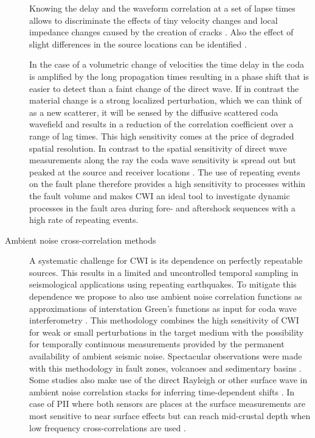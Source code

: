 \documentclass[11pt]{article}
\begin{document}
\begin{description}
Knowing the delay and the waveform correlation at a set of lapse times allows to discriminate the effects of tiny velocity changes and local impedance changes caused by the creation of cracks \citep{Larose2010}. Also the effect of slight differences in the source locations can be identified \citep{Snieder2005,Kummerow2010}.

In the case of a volumetric change of velocities the time delay in the coda is amplified by the long propagation times resulting in a phase shift that is easier to detect than a faint change of the direct wave. If in contrast the material change is a strong localized perturbation, which we can think of as a new scatterer, it will be sensed by the diffusive scattered coda wavefield and results in a reduction of the correlation coefficient over a range of lag times.
This high sensitivity comes at the price of degraded spatial resolution. In contrast to the spatial sensitivity of direct wave measurements along the ray the coda wave sensitivity is spread out but peaked at the source and receiver locations \citep{pacheco_snieder_JASA_05,planes_etal_WCRM_14,obermann13}. The use of repeating events on the fault plane therefore provides a high sensitivity to processes within the fault volume and makes CWI an ideal tool  to investigate dynamic processes in the fault area during fore- and aftershock sequences with a high rate of repeating events.


\item[Ambient noise cross-correlation methods]
A systematic challenge for CWI is its dependence on perfectly repeatable sources. This results in a limited and uncontrolled temporal sampling in seismological applications using repeating earthquakes. To mitigate this dependence we propose to also use ambient noise correlation functions as approximations of interstation Green's functions as input for coda wave interferometry \citep{sens-schoenfelder_wegler_GRL_06}. This methodology combines the high sensitivity of CWI for weak or small perturbations in the target medium with the possibility for temporally continuous measurements provided by the permanent availability of ambient seismic noise.
Spectacular observations were made with this methodology in fault zones, volcanoes and sedimentary basins \citep{sens-schonfelder_etal_JVGR_14,Brenguier2014,Richter2014}.
Some studies also make use of the direct Rayleigh or other surface wave in ambient noise correlation stacks for inferring time-dependent shifts \citep[e.g.][]{xu09}. In case of PII where both sensors are places at the surface measurements are most sensitive to near surface effects but can reach mid-crustal depth when low frequency cross-correlations are used \citep{rivet_etal_GRL_11, froment_etal_GRL_13}.


\end{description}
\end{document}
